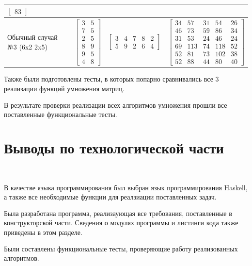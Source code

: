 \documentclass[12pt]{report}
\begin{document}
\begin{table}[H]
\begin{center}
\begin{tabular}{|p{2cm}|p{3.4cm}|p{3.9cm}|c|}
				$\begin{bmatrix}
				83
				\end{bmatrix}$ \\
				\hline
				Обычный случай №3 (6x2 2x5) & 
				$\begin{bmatrix}
				3 & 5\\
				7 & 5\\
				2 & 5\\
				8 & 9\\
				9 & 5\\
				4 & 8
				\end{bmatrix}$ & 
				$\begin{bmatrix}
				3 & 4 & 7 & 8 & 2\\
				5 & 9 & 2 & 6 & 4
				\end{bmatrix}$ & 
				$\begin{bmatrix}
				34 & 57 & 31 & 54 & 26\\
				46 & 73 & 59 & 86 & 34\\
				31 & 53 & 24 & 46 & 24\\
				69 & 113 & 74 & 118 & 52\\
				52 & 81 & 73 & 102 & 38\\
				52 & 88 & 44 & 80 & 40
				\end{bmatrix}$ \\
				\hline
			\end{tabular}
		\end{center}
	\end{table}
	
	Также были подготовлены тесты, в которых попарно сравнивались все 3 реализации функций умножения матриц.
	
	В результате проверки реализации всех алгоритмов умножения прошли все поставленные функциональные тесты.
	
	\section{Выводы по технологической части}
	
	~\
	
	В качестве языка программирования был выбран язык программирования Haskell, а также все необходимые функции для реалзиации поставленных задач.
	
	Была разработана программа, реализаующая все требования, поставленные в конструкторской части. Сведения о модулях программы и листинги кода также приведены в этом разделе.
	
	Были составлены функциональные тесты, проверяющие работу реализованных алгоритмов.
	
\end{document}
